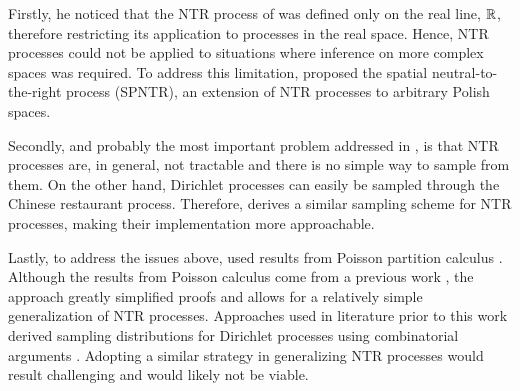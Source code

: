 Firstly, he noticed that the NTR process of \cite{doksum1974tailfree} was defined only on the real line, $\mathbb{R}$, therefore restricting its application to processes in the real space. Hence, NTR processes could not be applied to situations where inference on more complex spaces was required. To address this limitation, \cite{james2006poisson} proposed the spatial neutral-to-the-right process (SPNTR), an extension of NTR processes to arbitrary Polish spaces. 

Secondly, and probably the most important problem addressed in \cite{james2006poisson}, is that NTR processes are, in general, not tractable and there is no simple way to sample from them. On the other hand, Dirichlet processes can easily be sampled through the Chinese restaurant process. Therefore, \cite{james2006poisson} derives a similar sampling scheme for NTR processes, making their implementation more approachable.

Lastly, to address the issues above, \cite{james2006poisson} used results from Poisson partition calculus \cite{james2005poisson}. Although the results from Poisson calculus come from a previous work \cite{james2005poisson}, the approach greatly simplified proofs and allows for a relatively simple generalization of NTR processes. Approaches used in literature prior to this work derived sampling distributions for Dirichlet processes using combinatorial arguments \cite{antoniak1974mixtures,pitman2002combinatorial}. Adopting a similar strategy in generalizing NTR processes would result challenging and would likely not be viable. 
